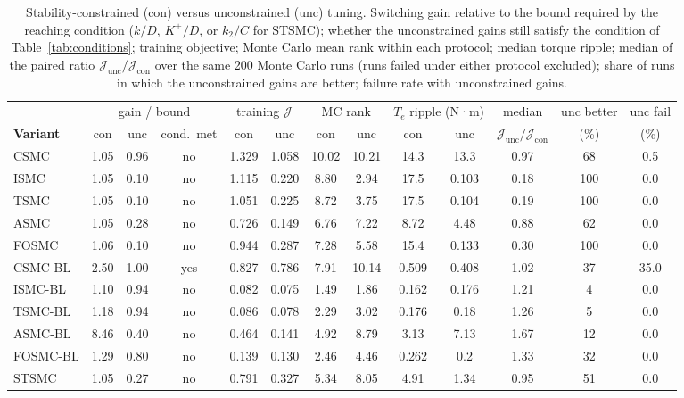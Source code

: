 \begin{table}[!t]
\centering
\caption{Stability-constrained (con) versus unconstrained (unc) tuning. Switching gain relative to the bound required by the reaching condition ($k/D$, $K^+/D$, or $k_2/C$ for STSMC); whether the unconstrained gains still satisfy the condition of Table~\ref{tab:conditions}; training objective; Monte Carlo mean rank within each protocol; median torque ripple; median of the paired ratio $\mathcal J_{\text{unc}}/\mathcal J_{\text{con}}$ over the same 200 Monte Carlo runs (runs failed under either protocol excluded); share of runs in which the unconstrained gains are better; failure rate with unconstrained gains.}
\label{tab:protocol}
\small
\setlength{\tabcolsep}{4pt}
\begin{tabular}{@{}lcccccccccccc@{}}
\toprule
 & \multicolumn{3}{c}{gain / bound} & \multicolumn{2}{c}{training $\mathcal J$} & \multicolumn{2}{c}{MC rank} & \multicolumn{2}{c}{$T_e$ ripple (N·m)} & median & unc better & unc fail \\
\cmidrule(lr){2-4}\cmidrule(lr){5-6}\cmidrule(lr){7-8}\cmidrule(lr){9-10}
\textbf{Variant} & con & unc & cond.\ met & con & unc & con & unc & con & unc & $\mathcal J_{\text{unc}}/\mathcal J_{\text{con}}$ & (\%) & (\%) \\
\midrule
CSMC & 1.05 & 0.96 & no & 1.329 & 1.058 & 10.02 & 10.21 & 14.3 & 13.3 & 0.97 & 68 & 0.5 \\
ISMC & 1.05 & 0.10 & no & 1.115 & 0.220 & 8.80 & 2.94 & 17.5 & 0.103 & 0.18 & 100 & 0.0 \\
TSMC & 1.05 & 0.10 & no & 1.051 & 0.225 & 8.72 & 3.75 & 17.5 & 0.104 & 0.19 & 100 & 0.0 \\
ASMC & 1.05 & 0.28 & no & 0.726 & 0.149 & 6.76 & 7.22 & 8.72 & 4.48 & 0.88 & 62 & 0.0 \\
FOSMC & 1.06 & 0.10 & no & 0.944 & 0.287 & 7.28 & 5.58 & 15.4 & 0.133 & 0.30 & 100 & 0.0 \\
CSMC-BL & 2.50 & 1.00 & yes & 0.827 & 0.786 & 7.91 & 10.14 & 0.509 & 0.408 & 1.02 & 37 & 35.0 \\
ISMC-BL & 1.10 & 0.94 & no & 0.082 & 0.075 & 1.49 & 1.86 & 0.162 & 0.176 & 1.21 & 4 & 0.0 \\
TSMC-BL & 1.18 & 0.94 & no & 0.086 & 0.078 & 2.29 & 3.02 & 0.176 & 0.18 & 1.26 & 5 & 0.0 \\
ASMC-BL & 8.46 & 0.40 & no & 0.464 & 0.141 & 4.92 & 8.79 & 3.13 & 7.13 & 1.67 & 12 & 0.0 \\
FOSMC-BL & 1.29 & 0.80 & no & 0.139 & 0.130 & 2.46 & 4.46 & 0.262 & 0.2 & 1.33 & 32 & 0.0 \\
STSMC & 1.05 & 0.27 & no & 0.791 & 0.327 & 5.34 & 8.05 & 4.91 & 1.34 & 0.95 & 51 & 0.0 \\
\bottomrule
\end{tabular}
\end{table}
